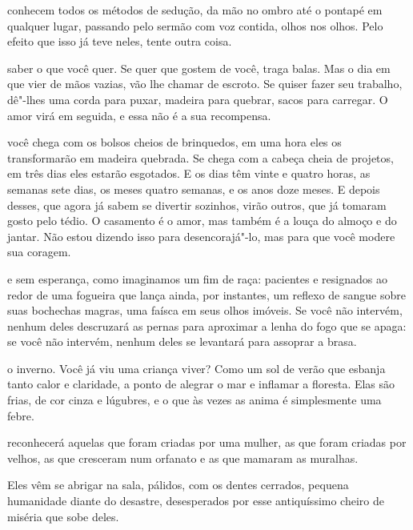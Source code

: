 \pagebreak
\thispagestyle{empty}


\movetooddpage

 conhecem todos os métodos de sedução, da mão no ombro até o pontapé
em qualquer lugar, passando pelo sermão com voz contida, olhos nos
olhos. Pelo efeito que isso já teve neles, tente outra coisa.




 saber o que você quer. Se quer que gostem de você, traga
balas. Mas o dia em que vier de mãos vazias, vão lhe chamar de escroto.
Se quiser fazer seu trabalho, dê"-lhes uma corda para puxar, madeira para
quebrar, sacos para carregar. O amor virá em seguida, e essa não é a sua
recompensa.




 você chega com os bolsos cheios de brinquedos, em uma hora eles os
transformarão em madeira quebrada. Se chega com a cabeça cheia de
projetos, em três dias eles estarão esgotados. E os dias têm vinte e
quatro horas, as semanas sete dias, os meses quatro semanas, e os anos
doze meses. E depois desses, que agora já sabem se divertir sozinhos,
virão outros, que já tomaram gosto pelo tédio. O casamento é o amor, mas
também é a louça do almoço e do jantar. Não estou dizendo isso para
desencorajá"-lo, mas para que você modere sua coragem.


\pagebreak

 e sem esperança, como imaginamos um fim de raça: pacientes e
resignados ao redor de uma fogueira que lança ainda, por instantes, um
reflexo de sangue sobre suas bochechas magras, uma faísca em seus olhos
imóveis. Se você não intervém, nenhum deles descruzará as pernas para
aproximar a lenha do fogo que se apaga: se você não intervém, nenhum
deles se levantará para assoprar a brasa.




 o inverno. Você já viu uma criança viver? Como um sol de verão
que esbanja tanto calor e claridade, a ponto de alegrar o mar e inflamar
a floresta. Elas são frias, de cor cinza e lúgubres, e o que às vezes as
anima é simplesmente uma febre.



 reconhecerá aquelas que foram criadas por uma mulher, as que foram
criadas por velhos, as que cresceram num orfanato e as que mamaram as
muralhas.



 Eles vêm se abrigar na sala, pálidos, com os dentes cerrados,
pequena humanidade diante do desastre, desesperados por esse
antiquíssimo cheiro de miséria que sobe deles.


